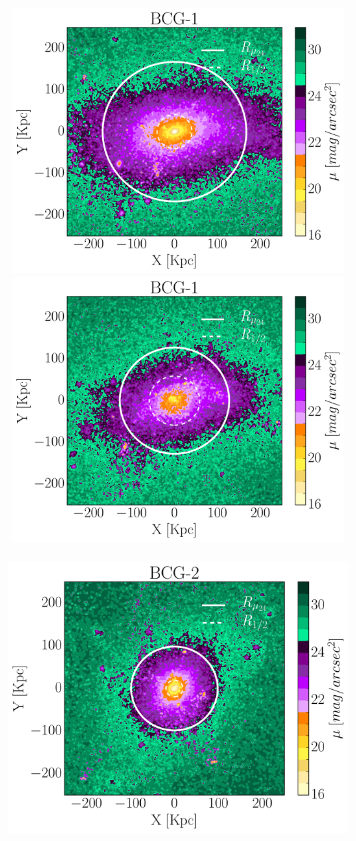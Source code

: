 \begin{figure}[H]
 \hspace*{-0.5cm}
 \includegraphics[height=7cm, width=9.0cm, trim={0cm 2.1cm 3.3cm 1cm},clip]{../al_final/LR/LR_CSF/nodust/grupo0/mu24/D1/091/maps_D1_aperturas.pdf}
 \hspace*{-0.27cm}
 \includegraphics[height=7cm, width=9.0cm, trim={3.2cm 2.1cm 0cm 1cm},clip]{../al_final/LR/LR_minpot3_rmmax/nodust/grupo0/mu24/D1/091/maps_D1_aperturas.pdf}
 \\
  \hspace*{-0.5cm}
 \includegraphics[height=8cm, width=9.0cm, trim={0cm 0cm 3.3cm 1.1cm},clip]{../al_final/LR/LR_CSF/nodust/grupo0/mu24/D2/091/maps_D2_aperturas.pdf}

\end{figure}
